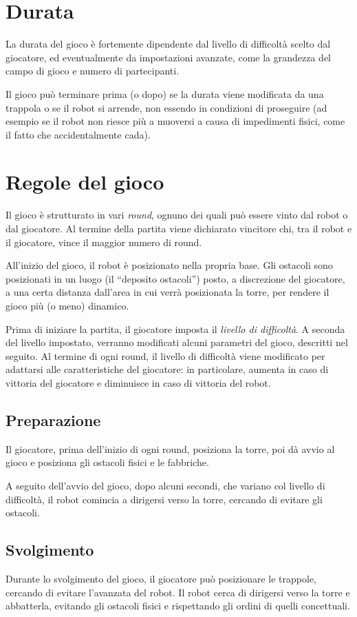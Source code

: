 \section{Durata} 
La durata del gioco è fortemente dipendente dal livello di difficoltà scelto dal giocatore, ed eventualmente da impostazioni avanzate, come la grandezza del campo di gioco e numero di partecipanti.

Il gioco può terminare prima (o dopo) se la durata viene modificata da una trappola o se il robot si arrende, non essendo in condizioni di proseguire (ad esempio se il robot non riesce più a muoversi a causa di impedimenti fisici, come il fatto che accidentalmente cada). 

\section{Regole del gioco} 
Il gioco è strutturato in vari \emph{round}, ognuno dei quali può essere vinto dal robot o dal giocatore. Al termine della partita viene dichiarato vincitore chi, tra il robot e il giocatore, vince il maggior numero di round.

All'inizio del gioco, il robot è posizionato nella propria base. Gli ostacoli sono posizionati in un luogo (il ``deposito ostacoli'') posto, a discrezione del giocatore, a una certa distanza dall'area in cui verrà posizionata la torre, per rendere il gioco più (o meno) dinamico.

Prima di iniziare la partita, il giocatore imposta il \emph{livello di difficoltà}. A seconda del livello impostato, verranno modificati alcuni parametri del gioco, descritti nel seguito. Al termine di ogni round, il livello di difficoltà viene modificato per adattarsi alle caratteristiche del giocatore: in particolare, aumenta in caso di vittoria del giocatore e diminuisce in caso di vittoria del robot.


	\subsection*{Preparazione}
Il giocatore, prima dell'inizio di ogni round, posiziona la torre, poi dà avvio al gioco e posiziona gli ostacoli fisici e le fabbriche.

A seguito dell'avvio del gioco, dopo alcuni secondi, che variano col livello di difficoltà, il robot comincia a dirigersi verso la torre, cercando di evitare gli ostacoli.
	
	\subsection*{Svolgimento}
	Durante lo svolgimento del gioco, il giocatore può posizionare le trappole, cercando di evitare l'avanzata del robot. Il robot cerca di dirigersi verso la torre e abbatterla, evitando gli ostacoli fisici e rispettando gli ordini di quelli concettuali.

